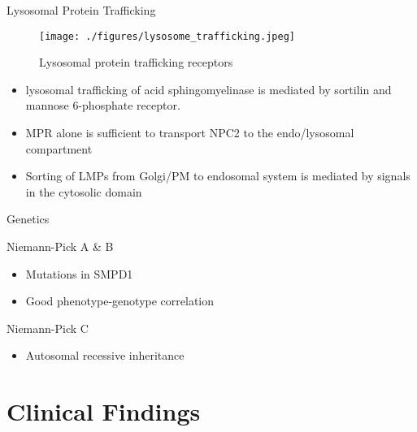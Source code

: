\documentclass[presentation, smaller]{beamer}
\begin{document}
\begin{frame}[label={sec:orgheadline8}]{Lysosomal Protein Trafficking}
\begin{figure}[htb]
\centering
\texttt{[image: ./figures/lysosome\_trafficking.jpeg]}
\caption[traf]{\label{fig:traf}
Lysosomal protein trafficking receptors}
\end{figure}

\footnotesize
\begin{itemize}
\item lysosomal trafficking of acid sphingomyelinase is mediated by sortilin and mannose 6-phosphate receptor.
\item MPR alone is sufficient to transport NPC2 to the endo/lysosomal compartment
\item Sorting of LMPs from Golgi/PM to endosomal system is mediated by
signals in the cytosolic domain
\end{itemize}
\end{frame}

\begin{frame}[label={sec:orgheadline9}]{Genetics}
\begin{block}{Niemann-Pick A \& B}
\begin{itemize}
\item Mutations in SMPD1
\item Good phenotype-genotype correlation
\end{itemize}
\end{block}
\begin{block}{Niemann-Pick C}
\begin{itemize}
\item Autosomal recessive inheritance
\end{itemize}
\end{block}
\end{frame}

\section{Clinical Findings}
\label{sec:orgheadline14}
\end{document}
